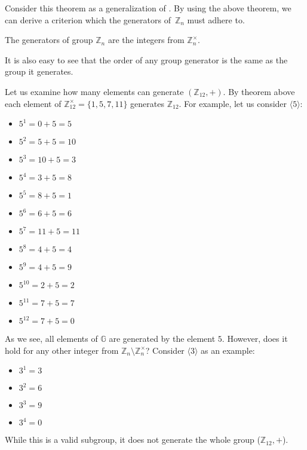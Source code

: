 \documentclass[../lecture-notes-148x210.tex]{subfiles}
\begin{document}
Consider this theorem as a generalization of . By
using the above theorem, we can derive a criterion which the generators
of~$\mathbb{Z}_n$ must adhere to.

\begin{corollary} \label{cor:}
    The generators of group $\mathbb{Z}_n$ are the integers from $\mathbb{Z}_n^{\times}$.
\end{corollary}

It is also easy to see that the order of any group generator is the same as the group it generates.

\begin{example}
    Let us examine how many elements can generate $(\mathbb{Z}_{12}, +)$. By
    theorem above each element of $\mathbb{Z}_{12}^{\times} = \{1, 5, 7, 11\}$
    generates $\mathbb{Z}_{12}$. For example, let us consider $\langle 5
    \rangle$:
    \begin{xmulticols}{3}
        \begin{itemize}
            \item $5^{1} = 0 + 5 = 5$
            \item $5^{2} = 5 + 5 = 10$
            \item $5^{3} = 10 + 5 = 3$
            \item $5^{4} = 3  + 5 = 8$
            
            \item $5^{5} = 8 + 5 = 1$
            \item $5^{6} = 6 + 5 = 6$
            \item $5^{7} = 11 + 5 = 11$
            \item $5^{8} = 4 + 5 = 4$
            
            \item $5^{9} = 4 + 5= 9$
            \item $5^{10} = 2 + 5 = 2$
            \item $5^{11} = 7 + 5 = 7$
            \item $5^{12} = 7 + 5 = 0$
        \end{itemize}        
    \end{xmulticols}

    As we see, all elements of $\mathbb{G}$ are generated by the element $5$.
    However, does it hold for any other integer from $\mathbb{Z}_n \setminus
    \mathbb{Z}_n^{\times}$? Consider $\langle 3 \rangle$ as an example:
    \begin{xmulticols}{4}
        \begin{itemize}
            \item $3^{1} = 3$
            \item $3^{2} = 6$
            \item $3^{3} = 9$
            \item $3^{4} = 0$
        \end{itemize}
    \end{xmulticols} 

    While this is a valid subgroup, it does not generate the whole group
    ($\mathbb{Z}_{12}, +$).
\end{example}
\end{document}
